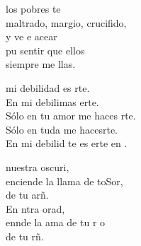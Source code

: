 \documentclass[12pt]{article}
\begin{document}
\begin{multicols*}{2}
\begin{cancion}%
	 los pobres  te \\
	maltrado, margio, crucifido,\\
	y ve e acear\\
	pu sentir que ellos\\
	siempre  me llas. \\
\end{cancion}%

\begin{cancion}%
	 mi debilidad es rte.\\
	En mi debilimas erte.\\
	Sólo en tu amor me haces rte.\\
	Sólo en tuda me hacesrte.\\
	En mi debilid te es erte en . \\
\end{cancion}%

\begin{cancion}%
	 nuestra oscuri,\\
	enciende la llama de toSor,\\
	de tu arñ. \\
	En ntra orad,\\
	ennde la ama de tu r o \\
	de tu rñ. \\
\end{cancion}%


\end{multicols*}
\end{document}
